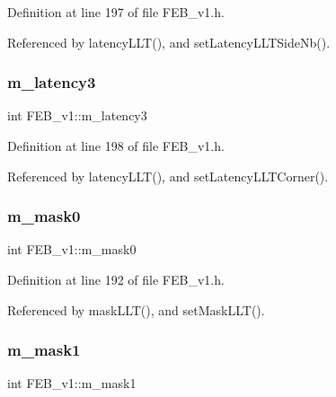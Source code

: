 Definition at line 197 of file F\+E\+B\+\_\+v1.\+h.



Referenced by latency\+L\+L\+T(), and set\+Latency\+L\+L\+T\+Side\+Nb().

\mbox{\label{classFEB__v1_a2f71bdcef05c845177a62610da490bf9}} 
\subsubsection{\texorpdfstring{m\+\_\+latency3}{m\_latency3}}
{\footnotesize\ttfamily int F\+E\+B\+\_\+v1\+::m\+\_\+latency3\hspace{0.3cm}{\ttfamily [private]}}



Definition at line 198 of file F\+E\+B\+\_\+v1.\+h.



Referenced by latency\+L\+L\+T(), and set\+Latency\+L\+L\+T\+Corner().

\mbox{\label{classFEB__v1_ab49d6a271bdfddd9c7fac9435e4e686d}} 
\subsubsection{\texorpdfstring{m\+\_\+mask0}{m\_mask0}}
{\footnotesize\ttfamily int F\+E\+B\+\_\+v1\+::m\+\_\+mask0\hspace{0.3cm}{\ttfamily [private]}}



Definition at line 192 of file F\+E\+B\+\_\+v1.\+h.



Referenced by mask\+L\+L\+T(), and set\+Mask\+L\+L\+T().

\mbox{\label{classFEB__v1_a1cbadb02155e2defdff6d6c8f70eb945}} 
\subsubsection{\texorpdfstring{m\+\_\+mask1}{m\_mask1}}
{\footnotesize\ttfamily int F\+E\+B\+\_\+v1\+::m\+\_\+mask1\hspace{0.3cm}{\ttfamily [private]}}



